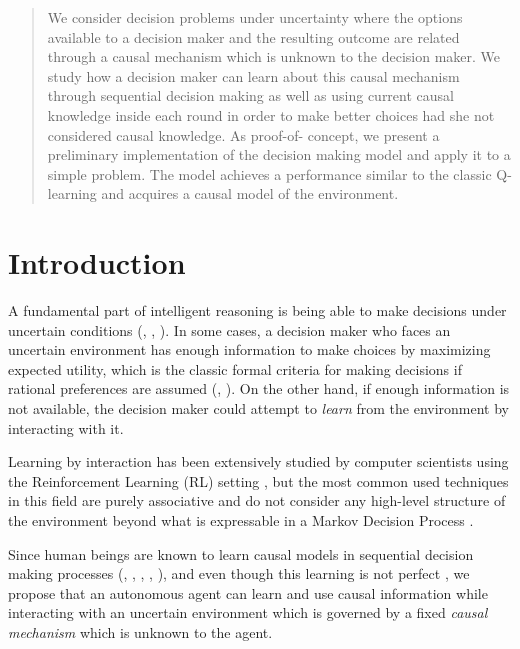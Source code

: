 \documentclass{article}
\begin{document}
\begin{abstract}
We consider decision problems under uncertainty where the options available to a decision maker and the resulting outcome are related through a causal mechanism which is unknown to the decision maker. We study how a decision maker can learn about this causal mechanism through sequential decision making as well as using current causal knowledge inside each round in order to make better choices had she not considered causal knowledge. As proof-of- concept, we present a preliminary implementation of the decision making model and apply it to a simple problem. The model achieves a performance similar to the classic Q-learning and acquires a causal model of the environment. 
\end{abstract}

\section{Introduction}
A fundamental part of intelligent reasoning is being able to make decisions under uncertain conditions (\cite{danks2014unifying}, \cite{lake2017building}, \cite{pearlwhy}). In some cases, a decision maker who faces an uncertain environment has enough information to make choices by maximizing expected utility, which is the classic formal criteria for making decisions if rational preferences are assumed (\cite{bernardo2000bayesian}, \cite{gilboa2009decision}). On the other hand, if enough information is not available, the decision maker could attempt to \textit{learn} from the environment by interacting with it.

Learning by interaction has been extensively studied by computer scientists using the Reinforcement Learning (RL) setting \cite{sutton1998reinforcement}, but the most common used techniques  in this field are purely associative and do not consider any high-level structure of the environment beyond what is expressable in a Markov Decision Process \cite{garnelo2016towards}.

Since human beings are known to learn causal models in sequential decision making processes (\cite{sloman2006causal}, \cite{nichols2007decision}, \cite{meder2010observing}, \cite{hagmayer2013repeated}, \cite{danks2014unifying}), and even though this learning is not perfect \cite{rottman2014reasoning}, we propose that an autonomous agent can learn and use causal information while interacting with an uncertain environment which is governed by a fixed \textit{causal mechanism} which is unknown to the agent.  
\end{document}
